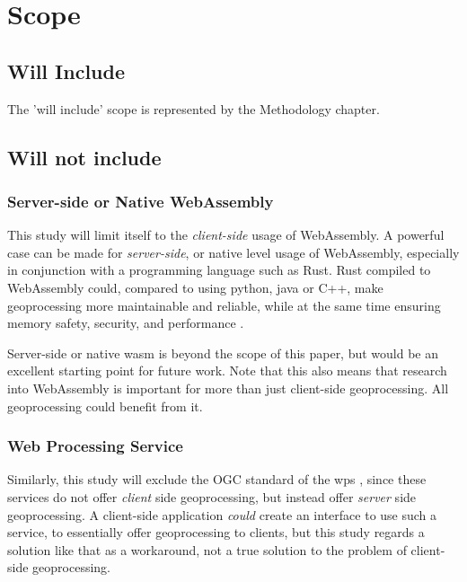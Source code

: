 \section{Scope}
\subsection*{Will Include}

The 'will include' scope is represented by the Methodology chapter. 


\subsection*{Will not include}

\subsubsection*{Server-side or Native WebAssembly} %

This study will limit itself to the \emph{client-side} usage of WebAssembly. 
A powerful case can be made for \emph{server-side}, or native level usage of WebAssembly, especially in conjunction with a programming language such as Rust. 
Rust compiled to WebAssembly could, compared to using python, java or C++, make geoprocessing more maintainable and reliable, while at the same time ensuring memory safety, security, and performance \cite{clack_standardizing_2019}. 

Server-side or native wasm is beyond the scope of this paper, but would be an excellent starting point for future work. Note that this also means that research into WebAssembly is important for more than just client-side geoprocessing. All geoprocessing could benefit from it.



\subsubsection*{Web Processing Service} %

Similarly, this study will exclude the OGC standard of the \ac{wps} \cite{ogc_web_2015}, since these services do not offer \emph{client} side geoprocessing, but instead offer \emph{server} side geoprocessing. A client-side application \textit{could} create an interface to use such a service, to essentially offer geoprocessing to clients, but this study regards a solution like that as a workaround, not a true solution to the problem of client-side geoprocessing. 

